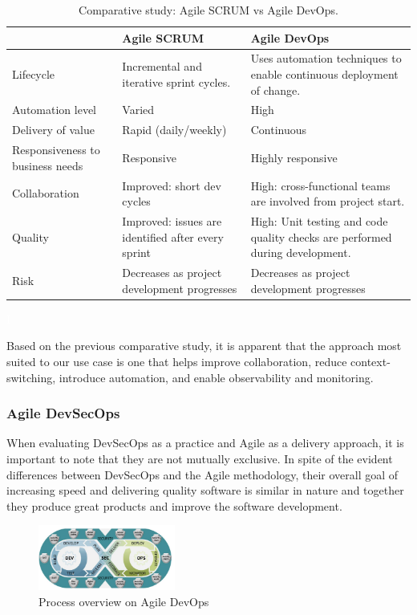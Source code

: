 \begin{table}[h!]
\center
\begin{tabular}[b]{|m{4cm}|m{5cm}|m{5cm}|}
\hline
\rowcolor{white}
 &  Agile SCRUM   & Agile DevOps  \\
\hline
 Lifecycle  
& Incremental and iterative sprint cycles. 
& Uses automation techniques to enable continuous deployment of change. \\
\hline
 Automation level  
&  Varied 
& High 
 \\
\hline
 Delivery of value 
&  Rapid (daily/weekly) 
& Continuous  \\
\hline
 Responsiveness to business needs 
&  Responsive 
& Highly responsive   \\
\hline
 Collaboration 
& Improved: short dev cycles 
& High: cross-functional teams are involved from project start. \\
\hline
Quality 
& Improved: issues are identified after every sprint 
& High: Unit testing and code quality checks are performed during development. \\
\hline
 Risk 
&  Decreases as project development progresses 
& Decreases as project development progresses \\
\hline
\end{tabular}
\caption{Comparative study: Agile SCRUM vs Agile DevOps.}
\textcolor{white}{I} \label{tab:tab-m}
\end{table}

\hspace{7mm}Based on the previous comparative study, it is apparent that the approach most suited to our use case is one that helps improve collaboration, reduce context-switching, introduce automation, and enable observability and monitoring.

\subsubsection{Agile DevSecOps }

\hspace{7mm}When evaluating DevSecOps as a practice and Agile as a delivery approach, it is important to note that they are not mutually exclusive. In spite of the evident differences between DevSecOps and the Agile methodology, their overall goal of increasing speed and delivering quality software is similar in nature and together they produce great products and improve the software development.

\begin{figure}[!ht]\centering
\includegraphics[width=0.4\textwidth,angle=00]{assets/f1.png}
\caption{Process overview on Agile DevOps}
\label{fig:processOverview}
\end{figure}

